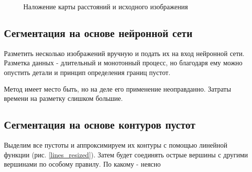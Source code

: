 \documentclass[a4paper, 14pt]{article}
\begin{document}
\begin{figure}[h]
\begin{center}
\begin{minipage}[h]{0.5\linewidth}
				\caption{Наложение карты расстояний и исходного изображения}
				\label{image+edt}
			\end{minipage}
		\end{center}
	\end{figure}
	
	
	\subsection{Сегментация на основе нейронной сети}
	
	Разметить несколько изображений вручную и подать их на вход нейронной сети.
	Разметка данных -  длительный и монотонный процесс, но благодаря ему можно опустить детали и принцип определения границ пустот. 
	
	Метод имеет место быть, но на деле его применение неоправданно. Затраты времени на разметку слишком большие.  
	
	
	
	
	\subsection{Сегментация на основе контуров пустот}
	\label{final}
	
	Выделим все пустоты и аппроксимируем их контуры с помощью линейной функции (рис. \ref{lines_resized}). Затем будет соединять острые вершины с другими вершинами по особому правилу. По какому - неясно
	
\end{document}
